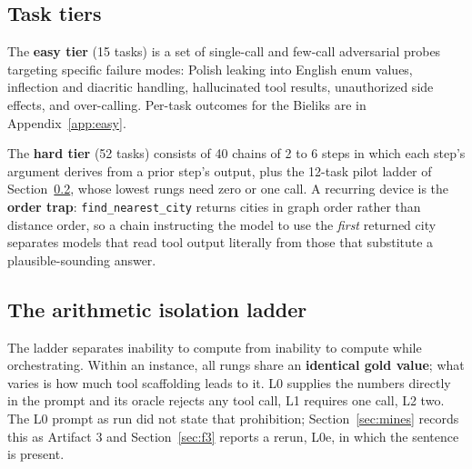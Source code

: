 \documentclass[11pt]{article}
\begin{document}
\subsection{Task tiers}
The \textbf{easy tier} (15 tasks) is a set of single-call and few-call adversarial probes targeting specific failure modes: Polish leaking into English enum values, inflection and diacritic handling, hallucinated tool results, unauthorized side effects, and over-calling. Per-task outcomes for the Bieliks are in Appendix~\ref{app:easy}.

The \textbf{hard tier} (52 tasks) consists of 40 chains of 2 to 6 steps in which each step's argument derives from a prior step's output, plus the 12-task pilot ladder of Section~\ref{sec:ladder}, whose lowest rungs need zero or one call. A recurring device is the \textbf{order trap}: \texttt{find\_nearest\_city} returns cities in graph order rather than distance order, so a chain instructing the model to use the \emph{first} returned city separates models that read tool output literally from those that substitute a plausible-sounding answer.

\subsection{The arithmetic isolation ladder}
\label{sec:ladder}
The ladder separates inability to compute from inability to compute while orchestrating. Within an instance, all rungs share an \textbf{identical gold value}; what varies is how much tool scaffolding leads to it. L0 supplies the numbers directly in the prompt and its oracle rejects any tool call, L1 requires one call, L2 two. The L0 prompt as run did not state that prohibition; Section~\ref{sec:mines} records this as Artifact 3 and Section~\ref{sec:f3} reports a rerun, L0e, in which the sentence is present.
\end{document}
